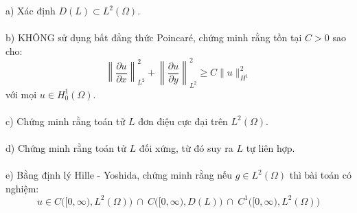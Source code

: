 \documentclass[10.5pt, a4paper]{article}
\begin{document}
\color{red}a) \color{black}Xác định $D(L)\subset L^2(\Omega)$.\\\\
\color{red}b) \color{black}KHÔNG sử dụng bất đẳng thức Poincaré, chứng minh rằng tồn tại $C>0$ sao cho: $$\left\lVert\dfrac{\partial u}{\partial x}\right\rVert_{L^2}^2+\left\lVert\dfrac{\partial u}{\partial y}\right\rVert_{L^2}^2\ge C\lVert u\rVert_{H^1}^2$$
với mọi $u\in H_0^1(\Omega)$.\\\\
\color{red}c) \color{black}Chứng minh rằng toán tử $L$ đơn điệu cực đại trên $L^2(\Omega)$.\\\\
\color{red}d) \color{black}Chứng minh rằng toán tử $L$ đối xứng, từ đó suy ra $L$ tự liên hợp.\\\\
\color{red}e) \color{black}Bằng định lý Hille - Yoshida, chứng minh rằng nếu $g\in L^2(\Omega)$ thì bài toán có nghiệm: $$u\in C\big([0,\infty),L^2(\Omega)\big)~\cap~ C\big([0,\infty),D(L)\big)~\cap~ C^1\big([0,\infty),L^2(\Omega)\big)$$

\newpage
\end{document}
